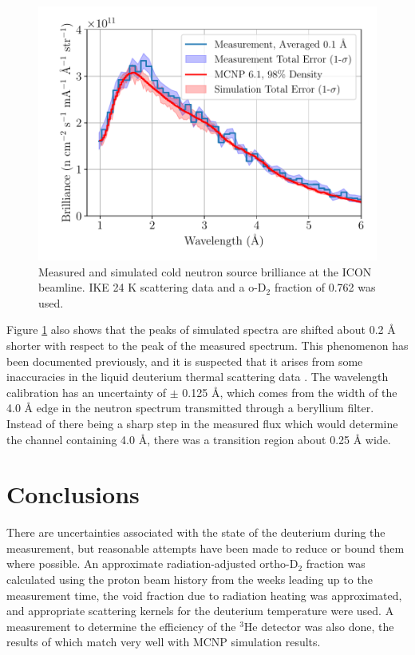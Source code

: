 \documentclass[5p,12pt]{elsarticle}
\begin{document}
\begin{figure}[h!] 
  \centering
    \includegraphics[width=\columnwidth]{graphics/brightness.pdf}
     \caption{Measured and simulated cold neutron source brilliance at the ICON beamline.  IKE 24 K scattering data and a o-D$_2$ fraction of 0.762 was used. \label{fig:brilliance} }
\end{figure}

Figure \ref{fig:brilliance} also shows that the peaks of simulated spectra are shifted about 0.2 {\AA} shorter with respect to the peak of the measured spectrum.  This phenomenon has been documented previously, and it is suspected that it arises from some inaccuracies in the liquid deuterium thermal scattering data \cite{giller_thesis}.  The wavelength calibration has an uncertainty of $\pm$ 0.125 {\AA}, which comes from the width of the 4.0 {\AA} edge in the neutron spectrum transmitted through a beryllium filter.  Instead of there being a sharp step in the measured flux which would determine the channel containing 4.0 {\AA}, there was a transition region about 0.25 {\AA} wide.

%
%
%
%
%

\section{Conclusions}
\label{sec:conclusions}

There are uncertainties associated with the state of the deuterium during the measurement, but reasonable attempts have been made to reduce or bound them where possible.  An approximate radiation-adjusted ortho-D$_2$ fraction was calculated using the proton beam history from the weeks leading up to the measurement time, the void fraction due to radiation heating was approximated, and appropriate scattering kernels for the deuterium temperature were used.  A measurement to determine the efficiency of the $^3$He detector was also done, the results of which match very well with MCNP simulation results.
\end{document}
